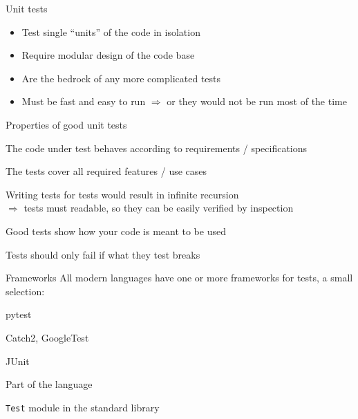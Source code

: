 \begin{frame}[c]{Unit tests}
  \begin{itemize}
    \item Test single \enquote{units} of the code in isolation
    \item Require modular design of the code base
    \item Are the bedrock of any more complicated tests
    \item Must be fast and easy to run $⇒$ or they would not be run most of the time
  \end{itemize}
\end{frame}

\begin{frame}[c]{Properties of good unit tests}
  \begin{description}[Demonstrability]
    \item[Existence] \faSmileWink[regular]
    \item[Correctness] The code under test behaves according to requirements / specifications
    \item[Completeness] The tests cover all required features / use cases
    \item[Readability] Writing tests for tests would result in infinite recursion\\
      $⇒$ tests must readable, so they can be easily verified by inspection
    \item[Demonstrability] Good tests show how your code is meant to be used
    \item[Resilience] Tests should only fail if what they test breaks
  \end{description}
\end{frame}

\begin{frame}[c]{Frameworks}
  All modern languages have one or more frameworks for tests, a small selection:

  \begin{description}[Python]
    \item[Python] pytest
    \item[C++] Catch2, GoogleTest
    \item[Java] JUnit
    \item[Rust] Part of the language
    \item[Julia] \texttt{Test} module in the standard library
  \end{description}
\end{frame}

